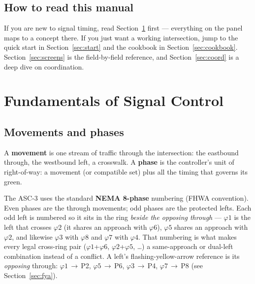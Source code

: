 \documentclass[11pt]{article}
\newcommand{\ph}[1]{\ensuremath{\varphi#1}}
\begin{document}
\subsection{How to read this manual}

If you are new to signal timing, read Section~\ref{sec:fund} first — everything on
the panel maps to a concept there. If you just want a working intersection, jump to
the quick start in Section~\ref{sec:start} and the cookbook in
Section~\ref{sec:cookbook}. Section~\ref{sec:screens} is the field-by-field
reference, and Section~\ref{sec:coord} is a deep dive on coordination.

\section{Fundamentals of Signal Control}\label{sec:fund}

\subsection{Movements and phases}

A \textbf{movement} is one stream of traffic through the intersection: the
eastbound through, the westbound left, a crosswalk. A \textbf{phase} is the
controller's unit of right-of-way: a movement (or compatible set) plus all the
timing that governs its green.

The ASC-3 uses the standard \textbf{NEMA 8-phase} numbering (FHWA convention).
Even phases are the through movements; odd phases are the protected lefts. Each
odd left is numbered so it sits in the ring \emph{beside the opposing through} —
\ph{1} is the left that crosses \ph{2} (it shares an approach with \ph{6}), \ph{5}
shares an approach with \ph{2}, and likewise \ph{3} with \ph{8} and \ph{7} with
\ph{4}. That numbering is what makes every legal cross-ring pair
(\ph{1}+\ph{6}, \ph{2}+\ph{5}, \ldots) a same-approach or dual-left combination
instead of a conflict. A left's flashing-yellow-arrow reference is its
\emph{opposing} through: \ph{1}\,$\to$\,P2, \ph{5}\,$\to$\,P6, \ph{3}\,$\to$\,P4,
\ph{7}\,$\to$\,P8 (see Section~\ref{sec:fya}).
\end{document}
